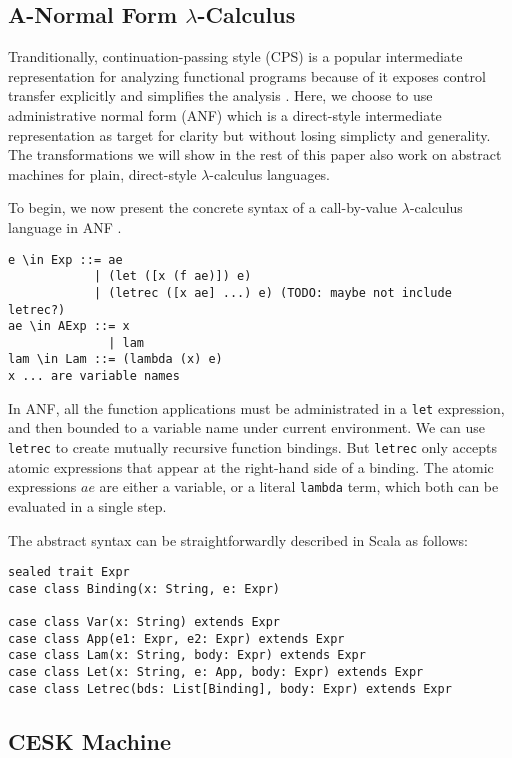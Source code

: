 \documentclass[acmsmall,review,anonymous]{acmart}\settopmatter{printfolios=true,printccs=false,printacmref=false}
\begin{document}
\subsection{A-Normal Form $\lambda$-Calculus} \label{anfsyntax}

Tranditionally, continuation-passing style (CPS) is a popular intermediate representation
for analyzing functional programs because of it exposes control transfer explicitly
and simplifies the analysis \cite{Shivers:1991:SSC:115865.115884, Shivers:1988:CFA:53990.54007}.
Here, we choose to use administrative normal form (ANF) which is a direct-style intermediate representation 
as target for clarity but without losing simplicty and generality.
The transformations we will show in the rest of this paper
also work on abstract machines for plain, direct-style $\lambda$-calculus languages.

To begin, we now present the concrete syntax of a call-by-value $\lambda$-calculus language 
in ANF \cite{flanagan1993essence}.

\begin{verbatim}
e \in Exp ::= ae
            | (let ([x (f ae)]) e)
            | (letrec ([x ae] ...) e) (TODO: maybe not include letrec?)
ae \in AExp ::= x
              | lam
lam \in Lam ::= (lambda (x) e)
x ... are variable names
\end{verbatim}

In ANF, all the function applications must be administrated in a \texttt{let} expression,
and then bounded to a variable name under current environment.
We can use \texttt{letrec} to create mutually recursive function bindings. But \texttt{letrec}
only accepts atomic expressions that appear at the right-hand side of a binding.
The atomic expressions $ae$ are either a variable, or a literal \texttt{lambda} term, which
both can be evaluated in a single step.

The abstract syntax can be straightforwardly described in Scala as follows:

\begin{verbatim}
sealed trait Expr
case class Binding(x: String, e: Expr)

case class Var(x: String) extends Expr
case class App(e1: Expr, e2: Expr) extends Expr
case class Lam(x: String, body: Expr) extends Expr
case class Let(x: String, e: App, body: Expr) extends Expr
case class Letrec(bds: List[Binding], body: Expr) extends Expr
\end{verbatim}

\subsection{CESK Machine}
\end{document}

